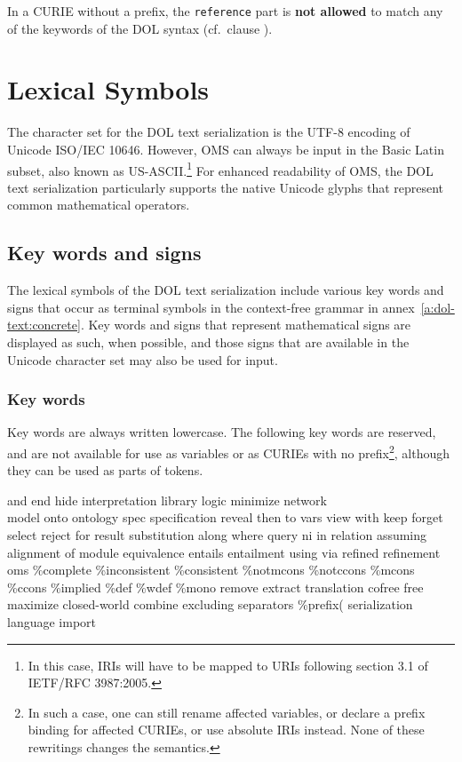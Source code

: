 \documentclass[10pt,fleqn,%
\ifpretendfinal
final%
\else
draft%
\fi,
]{scrreprt}
\makeatletter
\newcommand*\CommentAuthor{}
\renewcommand*\CommentAuthor{#1}}
\newcommand*\CommentDate{}
\renewcommand*\CommentDate{#1}}
\newcommand*\CommentId{}
\renewcommand*\CommentId{#1}}
\newcommand*\CommentType{}
\renewcommand*\CommentType{#1}}
\newcommand*{\SetCommentColorByType}[1]{%
\edef\localType{{#1}}%
\expandafter\ifstrequal\localType{q-aut}{\colorlet{CommentColor}{red}}{%
\expandafter\ifstrequal\localType{q-all}{\colorlet{CommentColor}{orange}}{%
\expandafter\ifstrequal\localType{todo}{\colorlet{CommentColor}{orange}}{%
\expandafter\ifstrequal\localType{fyi}{\colorlet{CommentColor}{lightgray}}{%
\colorlet{CommentColor}{yellow}}}}}}
\newcommand*{\SetCommentPrefixByType}[1]{%
\edef\localType{{#1}}%
\expandafter\@ifmtarg\localType{%
\edef\CommentPrefix{}%
}{%
\caseupper[q]{#1}%
\edef\CommentPrefix{\thestring: }%
}}
\newcommand*{\initComment}[1]{%
\setkeys{Comment}{#1}%
\SetCommentColorByType{\CommentType}%
\relax%
\SetCommentPrefixByType{\CommentType}%
\relax%
}
\newcommand*{\todonote}[2][]{%
\initComment{#1}%
\pdfcomment[author=\CommentAuthor,color=CommentColor,date=\CommentDate,id=\CommentId]{%
\CommentPrefix
#2}}
\renewcommand*{\todonote}[2][]{%
\initComment{#1}%
\ednote{\CommentPrefix #2}}
\newcommand*{\syntax}[1]{\texttt{#1}}
\newcommand*{\notallowed}{\textbf{not allowed}\xspace}
\newcommand{\annexrefname}{annex}
\newcommand{\aref}[1]{\annexrefname~\ref{#1}}
\newcommand{\sclause}[1]{\section{#1}}
\newcommand{\ssclause}[1]{\subsection{#1}}
\newcommand{\sssclause}[1]{\subsubsection{#1}}
\newcommand{\nisref}[1]{#1}
\makeatother
\begin{document}
In a CURIE without a prefix, the \syntax{reference} part is \notallowed to match any of the keywords of the DOL syntax (cf.\ clause \label{c:keywords}).

\sclause{Lexical Symbols}

The character set for the DOL text serialization is the UTF-8 encoding of Unicode \nisref{ISO/IEC 10646}.  However, OMS can always be input in the Basic Latin subset, also known as US-ASCII.\footnote{In this case, IRIs will have to be mapped to URIs following section 3.1 of \nisref{IETF/RFC 3987:2005}.}  For enhanced readability of OMS, the DOL text serialization particularly supports the native Unicode glyphs that represent common mathematical operators.%

\ssclause{Key words and signs}\label{c:keywords}

The lexical symbols of the DOL text serialization include various key words and signs that occur as terminal symbols in the context-free grammar in \aref{a:dol-text:concrete}.  Key words and signs that represent mathematical signs are displayed as such, when possible, and those signs that are available in the Unicode character set may also be used for input.

\sssclause{Key words}

Key words are always written lowercase. The following key words are reserved, and are not available for use as variables or as CURIEs with no prefix\footnote{In such a case, one can still rename affected variables, or declare a prefix binding for affected CURIEs, or use absolute IRIs instead.  None of these rewritings changes the semantics.}, although they can be used as parts of tokens. 

{\ttfamily %
and
end
hide
interpretation
library
logic
minimize
network\\
model
onto
ontology
spec
specification
reveal
then
to
vars
view
with
keep
forget
select
reject
%
for
result
substitution
along
where
query
ni
in
relation
assuming
alignment
of
module
equivalence
entails
entailment
using 
via
refined
refinement
oms
\%complete
\%inconsistent
\%consistent
\%notmcons
\%notccons
\%mcons
\%ccons
\%implied
\%def
\%wdef
\%mono
remove
extract
translation
cofree
free
maximize
closed-world
combine
excluding
separators
\%prefix(
serialization
language
import
}
\end{document}
